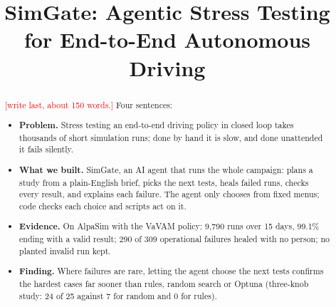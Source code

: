 \documentclass[conference]{IEEEtran}
\newcommand{\pending}[1]{\textcolor{red}{[#1]}}
\begin{document}
\title{SimGate: Agentic Stress Testing\\for End-to-End Autonomous Driving}

\author{\IEEEauthorblockN{Will Varner, \pending{co-author}, and Yunli Shao}
}

\maketitle

\begin{abstract}
\pending{write last, about 150 words.} Four sentences:
\begin{itemize}
\item \textbf{Problem.} Stress testing an end-to-end driving policy in closed loop takes thousands of short simulation runs; done by hand it is slow, and done unattended it fails silently.
\item \textbf{What we built.} SimGate, an AI agent that runs the whole campaign: plans a study from a plain-English brief, picks the next tests, heals failed runs, checks every result, and explains each failure. The agent only chooses from fixed menus; code checks each choice and scripts act on it.
\item \textbf{Evidence.} On AlpaSim with the VaVAM policy: 9,790 runs over 15 days, 99.1\% ending with a valid result; 290 of 309 operational failures healed with no person; no planted invalid run kept.
\item \textbf{Finding.} Where failures are rare, letting the agent choose the next tests confirms the hardest cases far sooner than rules, random search or Optuna (three-knob study: 24 of 25 against 7 for random and 0 for rules).
\end{itemize}
\end{abstract}

\end{document}
